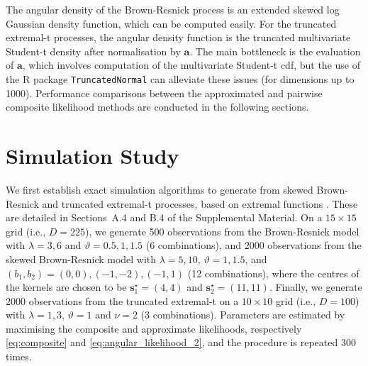 \documentclass[lineno]{biometrika}
\begin{document}
The angular density of the Brown-Resnick process is an extended skewed log Gaussian density function, which can be computed easily. For the truncated extremal-t processes, the angular density function is the truncated multivariate Student-t density after normalisation by $\bm a$. The main bottleneck is the evaluation of $\bm a$, which involves computation of the multivariate Student-t cdf, but the use of the R package \texttt{TruncatedNormal} \citep{Botev.Belzile:2021} can alleviate these issues (for dimensions up to 1000). Performance comparisons between the approximated and pairwise composite likelihood methods are conducted in the following sections.

\section{Simulation Study} %
\label{sec:sim} %

We first establish exact simulation algorithms to generate from skewed Brown-Resnick and truncated extremal-t processes, based on extremal functions \citep{Dombry.Engelke.Oesting:2016}. These are detailed in Sections~A.4 and B.4 of the Supplemental Material. On a $15\times15$ grid (i.e., $D=225$),  we generate 500 observations from the Brown-Resnick model with $\lambda=3,6$ and $\vartheta=0.5,1,1.5$ (6 combinations), and 2000 observations from the skewed Brown-Resnick model with $\lambda=5,10$, $\vartheta = 1,1.5$, and $(b_1,b_2) = (0,0),(-1,-2),(-1,1)$ (12 combinations), where the centres of the kernels are chosen to be $\bm s_1^\star = (4,4)$ and $\bm s_2^\star=(11,11)$. Finally, we generate 2000 observations from the truncated extremal-t on a $10\times10$ grid (i.e., $D=100$) with $\lambda=1,3$, $\vartheta=1$ and $\nu=2$ (3 combinations). Parameters are estimated by maximising the composite and approximate likelihoods, respectively \eqref{eq:composite} and \eqref{eq:angular_likelihood_2}, and the procedure is repeated 300 times.
\end{document}
